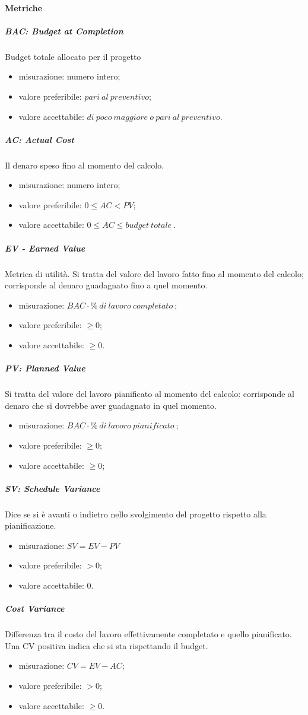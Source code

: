 		\paragraph{Metriche}
		\subparagraph{BAC: Budget at Completion}
		Budget totale allocato per il progetto
		\begin{itemize}
			\item misurazione: numero intero;
			\item valore preferibile: $pari\ al\ preventivo$;
			\item valore accettabile: $di\ poco\ maggiore\ o\ pari\ al\ preventivo$.
		\end{itemize}
			\subparagraph{AC: Actual Cost}
			Il denaro speso fino al momento del calcolo.
			\begin{itemize}
				\item  misurazione: numero intero;
				\item  valore preferibile: $0 \leq AC < PV$;
				\item  valore accettabile: $0 \leq AC \leq budget\ totale\ $.
			\end{itemize}
			\subparagraph{EV - Earned Value}
			Metrica di utilità. Si tratta del valore del lavoro fatto fino al momento del calcolo; corrisponde al denaro guadagnato fino a quel momento.
			\begin{itemize}
				\item  misurazione: $BAC \cdot \%\ di\ lavoro\ completato\ $;
				\item  valore preferibile: $ \geq 0$;
				\item  valore accettabile: $ \geq 0$.
			\end{itemize}
			\subparagraph{PV: Planned Value}
			Si tratta del valore del lavoro pianificato al momento del calcolo: corrisponde al denaro che si dovrebbe aver guadagnato in quel momento.
			\begin{itemize}
				\item  misurazione: $BAC \cdot \%\ di\ lavoro\ pianificato\ $;
				\item  valore preferibile: $ \geq 0$;
				\item  valore accettabile: $ \geq 0$;
			\end{itemize}			
			\subparagraph{SV: Schedule Variance}
			Dice se si è avanti o indietro nello svolgimento del progetto rispetto alla pianificazione.
			\begin{itemize}
				\item misurazione: $SV = EV - PV$
				\item valore preferibile: $ > 0$;
				\item valore accettabile: 0.
			\end{itemize}
			\subparagraph{Cost Variance}
			Differenza tra il costo del lavoro effettivamente completato e quello pianificato. Una CV positiva indica che si sta rispettando il budget.
			\begin{itemize}
				\item misurazione: $CV = EV - AC$;
				\item valore preferibile: $ > 0$;
				\item valore accettabile: $ \geq 0$.
			\end{itemize}

